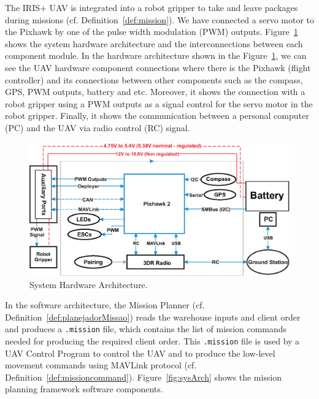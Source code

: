 \documentclass[conference]{IEEEtran}
\begin{document}
The IRIS+ UAV is integrated into a robot gripper to take and leave packages during missions (cf. Definition~\ref{def:mission}). We have connected a servo motor to the Pixhawk by one of the pulse width modulation (PWM) outputs. Figure~\ref{fig:hardArch} shows the system hardware architecture and the interconnections between each component module. In the hardware architecture shown in the Figure~\ref{fig:hardArch}, we can see the UAV hardware component connections where there is the Pixhawk (flight controller) and its connections between other components such as the compass, GPS, PWM outputs, battery and etc. Moreover, it shows the connection with a robot gripper using a PWM outputs as a signal control for the servo motor in the robot gripper. Finally, it shows the communication between a personal computer (PC) and the UAV via radio control (RC) signal.
%
\begin{figure}[H]
	\centering
	\includegraphics[width=\columnwidth]{arquiteturaIHW.eps}
	\caption{System Hardware Architecture.}
	\label{fig:hardArch}
\end{figure}

In the software architecture, the Mission Planner (cf. Definition~\ref{def:planejadorMissao}) reads the warehouse inputs and client order and produces a \texttt{.mission} file, which contains the list of mission commands needed for producing the required client order. This \texttt{.mission} file is used by a UAV Control Program to control the UAV and to produce the low-level movement commands using MAVLink protocol (cf. Definition~\ref{def:missioncommand}). Figure~\ref{fig:sysArch} shows the mission planning framework software components.
\end{document}
